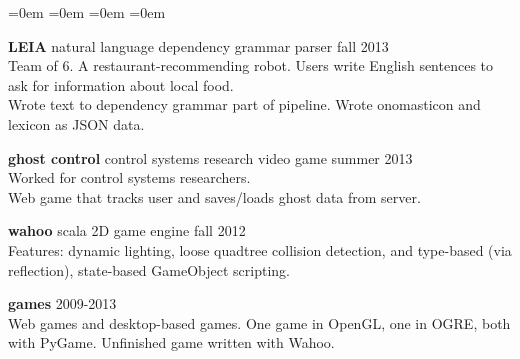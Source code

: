 \documentclass[margin]{res}
\newcommand{\tit}[1]{{
	\fontsize{11}{12}
	\selectfont
	\textbf{#1}
}}
\newenvironment{noindlist}
	{\begin{list}{}{
		\labelsep=0em \labelwidth=0em \leftmargin=0em \itemindent=0em
		\itemsep=3pt
	}}
	{\end{list}}
\begin{document}
\begin{resume}
\begin{noindlist}
	\item \tit{LEIA} \enspace \small{natural language dependency grammar parser} \hfill \textsf{fall 2013} \\
	Team of 6. A restaurant-recommending robot. Users write English sentences to ask for information about local food. \\
	Wrote text to dependency grammar part of pipeline. Wrote onomasticon and lexicon as JSON data.

	\item \tit{ghost control} \enspace \small{control systems research video game} \hfill \textsf{summer 2013} \\
	Worked for control systems researchers. \\
	Web game that tracks user and saves/loads ghost data from server.

	\item \tit{wahoo} \enspace \small{scala 2D game engine} \hfill \textsf{fall 2012} \hfill \\
	Features: dynamic lighting, loose quadtree collision detection, and type-based (via reflection), state-based GameObject scripting.

	\item \tit{games} \hfill \textsf{2009-2013} \\
	Web games and desktop-based games. One game in OpenGL, one in OGRE, both with PyGame. Unfinished game written with Wahoo.	
	\end{noindlist}

\end{resume}
\end{document}
